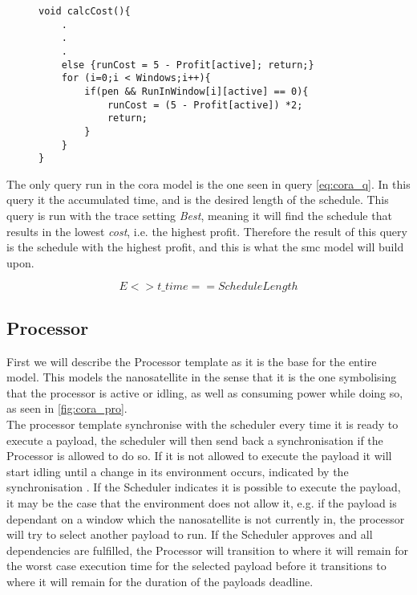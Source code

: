 \begin{figure}[h]
	\begin{lstlisting}[language=my_c, caption={Function calcCost(), used for calculating the cost rate}, label=lst:calcCost]
void calcCost(){
	.
	.
	.
	else {runCost = 5 - Profit[active]; return;}
	for (i=0;i < Windows;i++){ 
		if(pen && RunInWindow[i][active] == 0){
			runCost = (5 - Profit[active]) *2;
			return;
		} 
	}
}	
	\end{lstlisting}
\end{figure}


The only query run in the \gls{cora} model is the one seen in query \ref{eq:cora_q}. In this query  it the accumulated time, and  is the desired length of the schedule. This query is run with the trace setting \textit{Best}, meaning it will find the schedule that results in the lowest \textit{cost}, i.e. the highest profit. 
Therefore the result of this query is the schedule with the highest profit, and this is what the \gls{smc} model will build upon.

\begin{equation} \label{eq:cora_q}
E<> t\_time == ScheduleLength
\end{equation}

\subsection*{Processor}
First we will describe the Processor template as it is the base for the entire model. This models the nanosatellite in the sense that it is the one symbolising that the processor is active or idling, as well as consuming power while doing so, as seen in \cref{fig:cora_pro}. \\
The processor template synchronise with the scheduler every time it is ready to execute a payload, the scheduler will then send back a synchronisation if the Processor is allowed to do so. If it is not allowed to execute the payload it will start idling until a change in its environment occurs, indicated by the synchronisation . 
If the Scheduler indicates it is possible to execute the payload, it may be the case that the environment does not allow it, e.g. if the payload is dependant on a window which the nanosatellite is not currently in, the processor will try to select another payload to run. If the Scheduler approves and all dependencies are fulfilled, the Processor will transition to  where it will remain for the worst case execution time for the selected payload before it transitions to  where it will remain for the duration of the payloads deadline.

